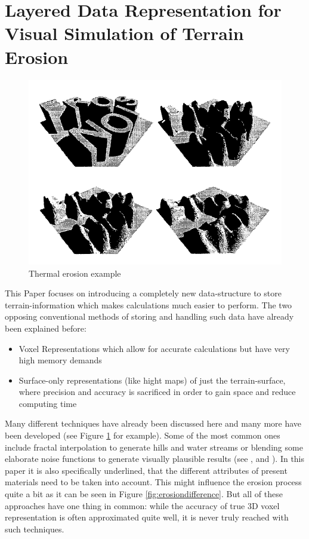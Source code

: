\section{Layered Data Representation for Visual Simulation of Terrain Erosion}


\begin{figure}[htb]
	\centering
	\includegraphics[width=\linewidth]{MGG_10/snap2.png}
	\caption{Thermal erosion example}
	\label{fig:thermal_erosion}
\end{figure}

This Paper \cite{marechal2010heat} focuses on introducing a completely new data-structure to store terrain-information which makes calculations much easier to perform. The two opposing conventional methods of storing and handling such data have already been explained before:
\begin{itemize}
	\item Voxel Representations which allow for accurate calculations but have very high memory demands
	\item Surface-only representations (like hight maps) of just the terrain-surface, where precision and accuracy is sacrificed in order to gain space and reduce computing time
\end{itemize}

Many different techniques have already been discussed here and many more have been developed (see Figure \ref{fig:thermal_erosion} for example). Some of the most common ones include fractal interpolation to generate hills and water streams \cite{kelley1988terrain} or blending some elaborate noise functions to generate visually plausible results (see \cite{eckbert2000simulating}, \cite{musgrave1989synthesis} and \cite{musgrave1999towards}). In this paper it is also specifically underlined, that the different attributes of present materials need to be taken into account. This might influence the erosion process quite a bit as it can be seen in Figure \ref{fig:erosiondifference}. But all of these approaches have one thing in common: while the accuracy of true 3D voxel representation is often approximated quite well, it is never truly reached with such techniques.

